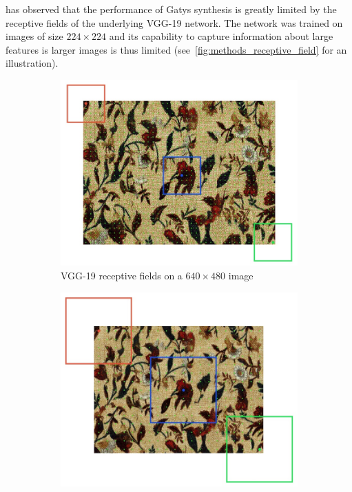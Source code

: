 \citet{Snelgrove2017} has observed that the performance of Gatys synthesis is greatly limited by the receptive fields of the underlying VGG-19 network. The network was trained on images of size \(224 \times 224\) and its capability to capture information about large features is larger images is thus limited (see~\ref{fig:methods_receptive_field} for an illustration).

\begin{figure}[ht]
    \centering
    \begin{subfigure}[b]{0.48\textwidth}
        \centering
        \includegraphics[width=\textwidth]{images/03-receptive_field-level0.jpg}
        \caption{VGG-19 receptive fields on a \(640 \times 480\) image}
        \label{fig:methods_receptive_field_lvl0}
    \end{subfigure}
    \hfill
    \begin{subfigure}[b]{0.48\textwidth}
        \centering
        \includegraphics[width=\textwidth]{images/03-receptive_field-level1.jpg}

\end{subfigure}
\end{figure}
